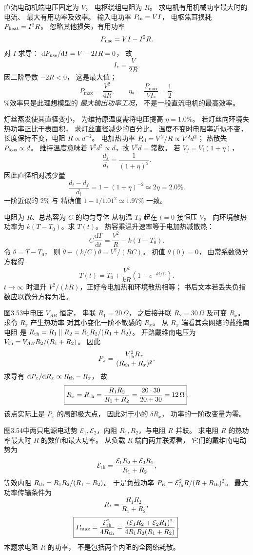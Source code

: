 直流电动机端电压固定为 $V$，
电枢绕组电阻为 $R$。
求电机有用机械功率最大时的电流、
最大有用功率及效率。
\exsolution
输入电功率 $P_{\rm in}=VI$，
电枢焦耳损耗 $P_{\rm heat}=I^2R$。
忽略其他损失，有用功率
\[
P_{\rm use}=VI-I^2R.
\]
对 $I$ 求导：
$\mathrm dP_{\rm use}/\mathrm dI=V-2IR=0$，
故
\[
\boxed{I_*=\frac V{2R}}.
\]
因二阶导数 $-2R<0$，
这是最大值；
\[
\boxed{P_{\max}=\frac{V^2}{4R}},
\qquad
\boxed{\eta_*=\frac{P_{\max}}{VI_*}=\frac12}.
\]
\%效率只是此理想模型的
\emph{最大输出功率工况}，
不是一般直流电机的最高效率。

灯丝蒸发使其直径变小，
为维持原温度需将电压提高
$\eta=1.0\%$。
若灯丝向环境失热功率正比于表面积，
求灯丝直径减少的百分比。
\exsolution
温度不变时电阻率近似不变，
长度保持不变，电阻 $R\propto d^{-2}$。
电加热功率
$P_{\rm el}=V^2/R\propto V^2d^2$；
热散失 $P_{\rm loss}\propto d$。
维持温度意味着
$V^2d^2\propto d$，故 $V^2d=\text{常数}$。
若 $V_f=V_i(1+\eta)$，
\[
\frac{d_f}{d_i}=\frac1{(1+\eta)^2}.
\]
因此直径相对减少量
\[
\boxed{\frac{d_i-d_f}{d_i}
=1-(1+\eta)^{-2}\simeq2\eta=2.0\%}.
\]
\excheck 一阶近似的 2\% 与
精确值 $1-1/1.01^2\simeq1.97\%$ 一致。

电阻为 $R$、总热容为 $C$ 的均匀导体
从初温 $T_0$ 起在 $t=0$ 接恒压 $V$。
向环境散热功率为
$k(T-T_0)$。求 $T(t)$。
\exsolution
热容乘温升速率等于电加热减散热：
\[
C\frac{\mathrm dT}{\mathrm dt}
=\frac{V^2}R-k(T-T_0).
\]
令 $\theta=T-T_0$，
则
$\dot\theta+(k/C)\theta=V^2/(RC)$。
初值 $\theta(0)=0$，
由常系数微分方程得
\[
\boxed{T(t)=T_0+
\frac{V^2}{kR}\left(1-e^{-kt/C}\right)}.
\]
\excheck $t\to\infty$ 时温升
$V^2/(kR)$，正好令电加热和环境散热相等；
书后文本若丢失负指数应以微分方程为准。

图3.53中电压 $V_{AB}$ 恒定，
串联 $R_1=20\,\Omega$，
之后接并联 $R_2=30\,\Omega$
及可变 $R_x$。求令 $R_x$ 产生热功率
对其小变化一阶不敏感的 $R_x$。
\exsolution
从 $R_x$ 端看其余网络的戴维南电阻
是
$R_{\rm th}=R_1\parallel R_2
=R_1R_2/(R_1+R_2)$。
开路戴维南电压为
$V_{\rm th}=V_{AB}R_2/(R_1+R_2)$。
因此
\[
P_x=\frac{V_{\rm th}^2R_x}
{(R_{\rm th}+R_x)^2}.
\]
求导有
$\mathrm dP_x/\mathrm dR_x\propto
R_{\rm th}-R_x$，
故
\[
\boxed{R_x=R_{\rm th}
=\frac{R_1R_2}{R_1+R_2}
=\frac{20\cdot30}{20+30}=12\,\Omega}.
\]
\excheck 该点实际上是 $P_x$ 的局部极大点，
因此对于小的 $\delta R_x$，
功率的一阶改变量为零。

图3.54中两只电源电动势
$\mathcal E_1,\mathcal E_2$，内阻
$R_1,R_2$，与电阻 $R$ 并联。
求电阻 $R$ 的热功率最大时
$R$ 的数值和最大功率。
\exsolution
从负载 $R$ 端向两并联源看，
它们的戴维南电动势为
\[
\mathcal E_{\rm th}=
\frac{\mathcal E_1R_2+\mathcal E_2R_1}{R_1+R_2},
\]
等效内阻
$R_{\rm th}=R_1R_2/(R_1+R_2)$。
于是负载功率
$P_R=\mathcal E_{\rm th}^2R/(R+R_{\rm th})^2$。
最大功率传输条件为
\[
\boxed{R_*=\frac{R_1R_2}{R_1+R_2}},
\]
\[
\boxed{P_{\max}=
\frac{\mathcal E_{\rm th}^2}{4R_{\rm th}}
=\frac{(\mathcal E_1R_2+\mathcal E_2R_1)^2}
{4R_1R_2(R_1+R_2)}}.
\]
\excheck 本题求电阻 $R$ 的功率，
不是包括两个内阻的全网络耗散。

